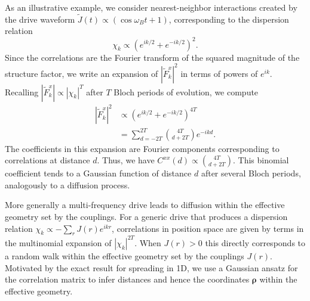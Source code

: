 \documentclass[aps,pra,superscriptaddress,12pt]{revtex4-1} %
\begin{document}
\begin{bibunit}
As an illustrative example, we consider nearest-neighbor interactions created by the drive waveform $\tilde{J}(t) \propto (\cos \omega_B t + 1)$, corresponding to the dispersion relation
\begin{equation}
    \chi_k \propto \left(e^{ik/2} + e^{-ik/2}\right)^2.
\end{equation}
Since the correlations are the Fourier transform of the squared magnitude of the structure factor, we write an expansion of $|\tilde{F}^x_k|^2$ in terms of powers of $e^{ik}$. Recalling $|\tilde{F}^x_k|\propto |\chi_k|^T$ after $T$ Bloch periods of evolution, we compute
\begin{equation}
\begin{aligned}
    |\tilde{F}^x_k|^2 &\propto \left(e^{ik/2} + e^{-ik/2}\right)^{4T} \\
    &=\sum_{d = -2T}^{2T} {{4T} \choose {d+2T}} e^{-ikd}.
\end{aligned}
\end{equation}
The coefficients in this expansion are Fourier components corresponding to correlations at distance $d$. Thus, we have $C^{xx}(d) \propto {{4T} \choose {d+2T}}$. This binomial coefficient tends to a Gaussian function of distance $d$ after several Bloch periods, analogously to a diffusion process.

More generally a multi-frequency drive leads to diffusion within the effective geometry set by the couplings. For a generic drive that produces a dispersion relation $\chi_k \propto -\sum_r J(r)e^{ikr}$, correlations in position space are given by terms in the multinomial expansion of $|\chi_k|^{2T}$. When $J(r)>0$ this directly corresponds to a random walk within the effective geometry set by the couplings $J(r)$. Motivated by the exact result for spreading in 1D, we use a Gaussian ansatz for the correlation matrix to infer distances and hence the coordinates $\boldsymbol{\rho}$ within the effective geometry.



\end{bibunit}
\end{document}
